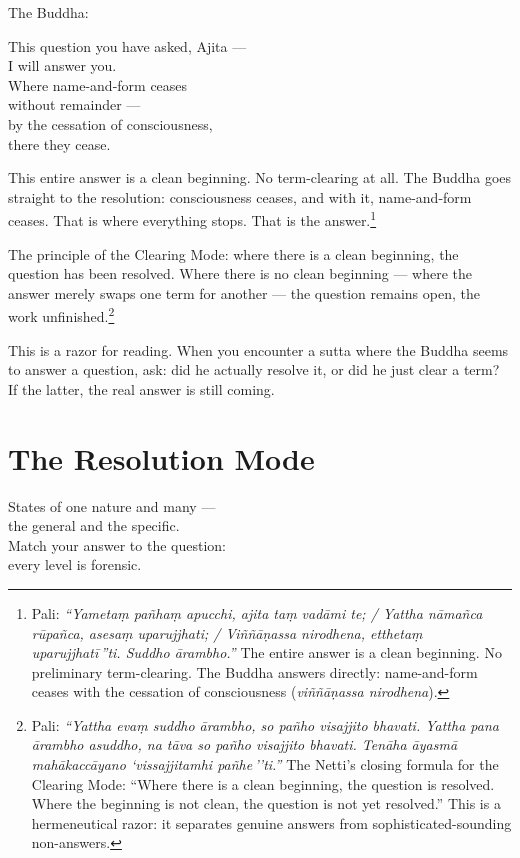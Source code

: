 The Buddha:

\begin{versebox}
This question you have asked, Ajita ---\\
I will answer you.\\
Where name-and-form ceases\\
without remainder ---\\
by the cessation of consciousness,\\
there they cease.
\end{versebox}

This entire answer is a clean beginning. No term-clearing at all. The Buddha goes straight to the resolution: consciousness ceases, and with it, name-and-form ceases. That is where everything stops. That is the answer.\footnote{Pali: \textit{``Yametaṃ pañhaṃ apucchi, ajita taṃ vadāmi te; / Yattha nāmañca rūpañca, asesaṃ uparujjhati; / Viññāṇassa nirodhena, etthetaṃ uparujjhatī\,''ti. Suddho ārambho.''} The entire answer is a clean beginning. No preliminary term-clearing. The Buddha answers directly: name-and-form ceases with the cessation of consciousness (\textit{viññāṇassa nirodhena}).}

The principle of the Clearing Mode: where there is a clean beginning, the question has been resolved. Where there is no clean beginning --- where the answer merely swaps one term for another --- the question remains open, the work unfinished.\footnote{Pali: \textit{``Yattha evaṃ suddho ārambho, so pañho visajjito bhavati. Yattha pana ārambho asuddho, na tāva so pañho visajjito bhavati. Tenāha āyasmā mahākaccāyano `vissajjitamhi pañhe\,''ti.''} The Netti's closing formula for the Clearing Mode: ``Where there is a clean beginning, the question is resolved. Where the beginning is not clean, the question is not yet resolved.'' This is a hermeneutical razor: it separates genuine answers from sophisticated-sounding non-answers.}

This is a razor for reading. When you encounter a sutta where the Buddha seems to answer a question, ask: did he actually resolve it, or did he just clear a term? If the latter, the real answer is still coming.

\ornament

\section*{The Resolution Mode}

\begin{versebox}
States of one nature and many ---\\
the general and the specific.\\
Match your answer to the question:\\
every level is forensic.
\end{versebox}


